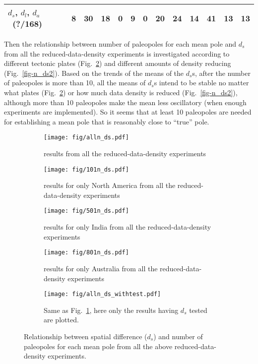 \begin{sidewaystable}
{\begin{tabular}{l|l|l|l|l|l|l|l|l|l|l|l|l}
\hline
\textbf{$d_s$}, \textbf{$d_l$}, \textbf{$d_a$}~(?/168) & 8                                 & 30                                & 18                                & 0                                 & 9                                 & 0                                 & 20                                & 24                                & 14                                & 41                                & 13                                & 13                                \\
\hline
\end{tabular}
}
\end{sidewaystable}

Then the relationship between number of paleopoles for each mean pole and $d_s$
from all the reduced-data-density experiments is investigated according to
different tectonic plates (Fig.~\ref{fig-n_ds}) and different amounts of density
reducing (Fig.~\ref{fig-n_ds2}). Based on the trends of the means of the $d_s$s,
after the number of paleopoles is more than 10, all the means of $d_s$s intend
to be stable no matter what plates (Fig.~\ref{fig-n_ds}) or how much data
density is reduced (Fig.~\ref{fig-n_ds2}), although more than 10 paleopoles make
the mean less oscillatory (when enough experiments are implemented). So it seems
that at least 10 paleopoles are needed for establishing a mean pole that is
reasonably close to ``true'' pole.

\begin{figure}
	\centering
	\begin{subfigure}{.49\textwidth}
		\texttt{[image: fig/alln\_ds.pdf]}
		\caption{results from all the reduced-data-density
		experiments}\label{fig-n_ds01}
	\end{subfigure}
	\begin{subfigure}{.49\textwidth}
		\texttt{[image: fig/101n\_ds.pdf]}
		\caption{results for only North America from all the reduced-data-density experiments}
	\end{subfigure}
	\begin{subfigure}{.49\textwidth}
		\texttt{[image: fig/501n\_ds.pdf]}
		\caption{results for only India from all the reduced-data-density experiments}
	\end{subfigure}
	\begin{subfigure}{.49\textwidth}
		\texttt{[image: fig/801n\_ds.pdf]}
		\caption{results for only Australia from all the reduced-data-density experiments}
	\end{subfigure}
	\begin{subfigure}{.49\textwidth}
		\texttt{[image: fig/alln\_ds\_withtest.pdf]}
		\caption{Same as Fig.~\ref{fig-n_ds01}, here only the results having
		$d_s$ tested are plotted.}
	\end{subfigure}
	\caption[ ]{Relationship between spatial difference ($d_s$) and number of
	paleopoles for each mean pole from all the above reduced-data-density
	experiments.}\label{fig-n_ds}
\end{figure}

